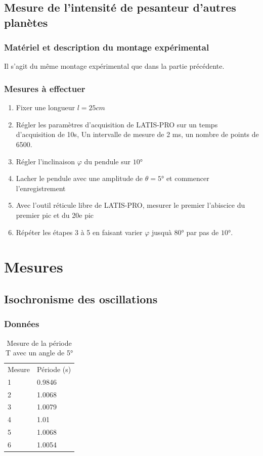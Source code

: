 \documentclass[a4paper,10pt,french]{scrartcl}
\begin{document}
\subsection{Mesure de l'intensité de pesanteur d'autres planètes}
\subsubsection{Matériel et description du montage expérimental}
Il s'agit du m\^eme montage expérimental que dans la partie précédente.
\subsubsection{Mesures à effectuer}
\begin{enumerate}
 \item Fixer une longueur \(l = 25 cm\)
 \item Régler les paramètres d'acquisition de LATIS-PRO sur un temps d'acquisition de 10s, Un intervalle de mesure de 2 ms, un nombre de points de 6500.
 \item Régler l'inclinaison \(\varphi\) du pendule sur \(10°\)
 \item Lacher le pendule avec une amplitude de \(\theta = 5°\) et commencer l'enregistrement
 \item Avec l'outil réticule libre de LATIS-PRO, mesurer le premier l'abiscice du premier pic et du 20e pic
 \item Répéter les étapes 3 à 5 en faisant varier \(\varphi\) jusquà \(80°\) par pas de \(10°\).
\end{enumerate}
\section{Mesures}
\subsection{Isochronisme des oscillations}
\subsubsection{Données}
\begin{table}[H]
\begin{center}
\begin{tabular}{ll}
Mesure & Période (s)\\
1 & 0.9846\\
2 & 1.0068\\
3 & 1.0079\\
4 & 1.01\\
5 & 1.0068\\
6 & 1.0054
\end{tabular}
\end{center}
\caption{Mesure de la période T avec un angle de 5°}
\end{table}
\end{document}

